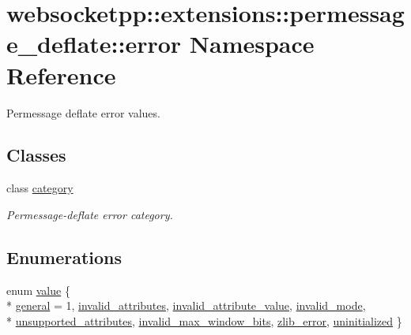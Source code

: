 \hypertarget{namespacewebsocketpp_1_1extensions_1_1permessage__deflate_1_1error}{}\section{websocketpp\+:\+:extensions\+:\+:permessage\+\_\+deflate\+:\+:error Namespace Reference}
\label{namespacewebsocketpp_1_1extensions_1_1permessage__deflate_1_1error}


Permessage deflate error values.  


\subsection*{Classes}
\begin{DoxyCompactItemize}
\item 
class \hyperlink{classwebsocketpp_1_1extensions_1_1permessage__deflate_1_1error_1_1category}{category}
\begin{DoxyCompactList}\small\item\em Permessage-\/deflate error category. \end{DoxyCompactList}\end{DoxyCompactItemize}
\subsection*{Enumerations}
\begin{DoxyCompactItemize}
\item 
enum \hyperlink{namespacewebsocketpp_1_1extensions_1_1permessage__deflate_1_1error_a38e53d7586dd60059cc99a5833bbe54e}{value} \{ \\*
\hyperlink{namespacewebsocketpp_1_1extensions_1_1permessage__deflate_1_1error_a38e53d7586dd60059cc99a5833bbe54eaea6d6b0b77348e739b118910c74b1ee0}{general} = 1, 
\hyperlink{namespacewebsocketpp_1_1extensions_1_1permessage__deflate_1_1error_a38e53d7586dd60059cc99a5833bbe54eae5f446fcc9f28756b471d89e879f7670}{invalid\+\_\+attributes}, 
\hyperlink{namespacewebsocketpp_1_1extensions_1_1permessage__deflate_1_1error_a38e53d7586dd60059cc99a5833bbe54ea5554d2f18722ee4c2a4c58bf7ffae079}{invalid\+\_\+attribute\+\_\+value}, 
\hyperlink{namespacewebsocketpp_1_1extensions_1_1permessage__deflate_1_1error_a38e53d7586dd60059cc99a5833bbe54eafc842b4166ec4bf89c14154581fa2a63}{invalid\+\_\+mode}, 
\\*
\hyperlink{namespacewebsocketpp_1_1extensions_1_1permessage__deflate_1_1error_a38e53d7586dd60059cc99a5833bbe54ea07d85052b0885acaa098a7fe3d8f7bee}{unsupported\+\_\+attributes}, 
\hyperlink{namespacewebsocketpp_1_1extensions_1_1permessage__deflate_1_1error_a38e53d7586dd60059cc99a5833bbe54ea23eace97896da0a8136d213fb1e4e987}{invalid\+\_\+max\+\_\+window\+\_\+bits}, 
\hyperlink{namespacewebsocketpp_1_1extensions_1_1permessage__deflate_1_1error_a38e53d7586dd60059cc99a5833bbe54ea9c98b21e33391203ce5f968428c03f3a}{zlib\+\_\+error}, 
\hyperlink{namespacewebsocketpp_1_1extensions_1_1permessage__deflate_1_1error_a38e53d7586dd60059cc99a5833bbe54eaa7d37064915d0ef64357e41763b42b7e}{uninitialized}
 \}
\end{DoxyCompactItemize}
